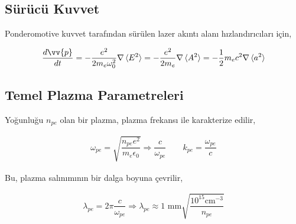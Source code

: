 \documentclass{article}
\begin{document}
\subsection{Sürücü Kuvvet}
Ponderomotive kuvvet tarafından sürülen lazer akıntı alanı hızlandırıcıları için,

\begin{align}
    \dfrac{d\vv{p}}{dt} = - \dfrac{e^{2}}{2m_{e} \omega_{0}^{2}} \nabla \braket{E^{2}} = -\dfrac{e^{2}}{2m_{e}} \nabla \braket{A^{2}} = -\dfrac{1}{2} m_{e}c^{2} \nabla \braket{a^{2}}
    \end{align}
    
\subsection{Temel Plazma Parametreleri}

Yoğunluğu $n_{pe}$ olan bir plazma, plazma frekansı ile karakterize edilir,

\begin{align}
    \omega_{pe} = \sqrt{ \dfrac{n_{pe}e ^{2}}{m_{e} \epsilon_{0} }} \Rightarrow \dfrac{c}{\omega_{pe}} \qquad k_{pe} = \dfrac{\omega_{pe}}{c}
\end{align}

Bu, plazma salınımının bir dalga boyuna çevrilir,

\begin{align}
\lambda_{pe} = 2 \pi \dfrac{c}{\omega_{pe}} \Rightarrow \lambda_{pe} \approx 1 \textrm{ mm} \sqrt{\dfrac{10^{15} \textrm{cm}^{-3} }{n_{pe}}}    
\end{align}
 
 
\newpage
\end{document}
